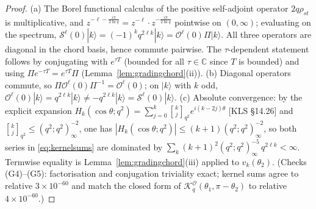 \documentclass[11pt,a4paper]{article}
\theoremstyle{definition}
\theoremstyle{plain}
\newcommand{\C}{\mathbb{C}}
\newcommand{\ket}[1]{|#1\rangle}
\renewcommand{\O}{\mathcal{O}}                  %
\newcommand{\K}{\mathcal{K}}                    %
\begin{document}
\begin{proof}
(a) The Borel functional calculus of the positive self-adjoint operator $2q\hat\rho_{st}$ is
multiplicative, and
$z^{-\ell-\frac{i\pi}{2\ln q}}=z^{-\ell}\cdot z^{-\frac{i\pi}{2\ln q}}$ pointwise on
$(0,\infty)$; evaluating on the spectrum, $\mathcal{S}^{\ell}(0)\ket{k}=(-1)^{k}q^{2\ell k}
\ket{k}=\O^{\ell}(0)\Pi\ket{k}$. All three operators are diagonal in the chord basis, hence
commute pairwise. The $\tau$-dependent statement follows by conjugating with $e^{\tau T}$
(bounded for all $\tau\in\C$ since $T$ is bounded) and using
$\Pi e^{-\tau T}=e^{\tau T}\Pi$ (Lemma~\ref{lem:gradingchord}(ii)).
(b) Diagonal operators commute, so $\Pi\O^{\ell}(0)\Pi^{-1}=\O^{\ell}(0)$; on $\ket{k}$ with
$k$ odd, $\O^{\ell}(0)\ket{k}=q^{2\ell k}\ket{k}\neq-q^{2\ell k}\ket{k}
=\mathcal{S}^{\ell}(0)\ket{k}$.
(c) Absolute convergence: by the explicit expansion
$H_{k}(\cos\theta;q^{2})=\sum_{j=0}^{k}\genfrac[]{0pt}{1}{k}{j}_{q^{2}}e^{i(k-2j)\theta}$
[KLS \cite{KLS2010} \S14.26] and
$\genfrac[]{0pt}{1}{k}{j}_{q^{2}}\le(q^{2};q^{2})_{\infty}^{-2}$, one has
$|H_{k}(\cos\theta;q^{2})|\le(k+1)(q^{2};q^{2})_{\infty}^{-2}$, so both series in
\eqref{eq:kernelsums} are dominated by
$\sum_{k}(k+1)^{2}(q^{2};q^{2})_{\infty}^{-5}\,q^{2\ell k}<\infty$. Termwise equality is
Lemma~\ref{lem:gradingchord}(iii) applied to $v_{k}(\theta_{2})$. (Checks (G4)--(G5):
factorisation and conjugation triviality exact; kernel sums agree to relative
$3\times10^{-60}$ and match the closed form of
$\K^{\O}_{q}(\theta_{1},\pi-\theta_{2})$ to relative $4\times10^{-60}$.)
\end{proof}
\end{document}
